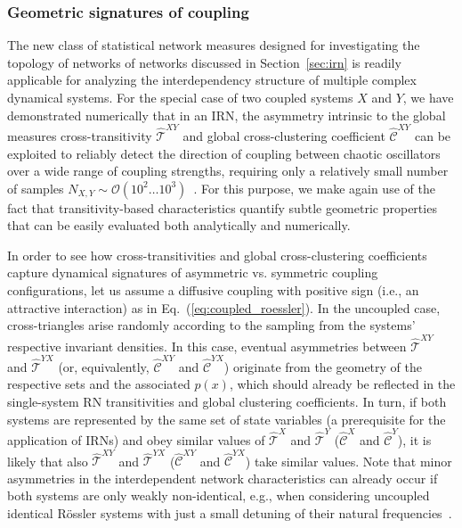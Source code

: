 \subsubsection{Geometric signatures of coupling}

The new class of statistical network measures designed for investigating the topology of networks of networks discussed in Section~\ref{sec:irn} is readily applicable for analyzing the interdependency structure of multiple complex dynamical systems. For the special case of two coupled systems $X$ and $Y$, we have demonstrated numerically that in an IRN, the asymmetry intrinsic to the global measures cross-transitivity $\hat{\mathcal{T}}^{XY}$ and global cross-clustering coefficient $\hat{\mathcal{C}}^{XY}$ can be exploited to reliably detect the direction of coupling between chaotic oscillators over a wide range of coupling strengths, requiring only a relatively small number of samples $N_{X,Y}\sim\mathcal{O}(10^2\dots 10^3)$~\cite{Feldhoff2012}. For this purpose, we make again use of the fact that transitivity-based characteristics quantify subtle geometric properties that can be easily evaluated both analytically and numerically. 

In order to see how cross-transitivities and global cross-clustering coefficients capture dynamical signatures of asymmetric vs. symmetric coupling configurations, let us assume a diffusive coupling with positive sign (i.e., an attractive interaction) as in Eq.~(\ref{eq:coupled_roessler}). In the uncoupled case, cross-triangles arise randomly according to the sampling from the systems' respective invariant densities. In this case, eventual asymmetries between $\hat{\mathcal{T}}^{XY}$ and $\hat{\mathcal{T}}^{YX}$ (or, equivalently, $\hat{\mathcal{C}}^{XY}$ and $\hat{\mathcal{C}}^{YX}$) originate from the geometry of the respective sets and the associated $p(x)$, which should already be reflected in the single-system RN transitivities and global clustering coefficients. In turn, if both systems are represented by the same set of state variables (a prerequisite for the application of IRNs) and obey similar values of $\hat{\mathcal{T}}^{X}$ and $\hat{\mathcal{T}}^{Y}$ ($\hat{\mathcal{C}}^{X}$ and $\hat{\mathcal{C}}^{Y}$), it is likely that also $\hat{\mathcal{T}}^{XY}$ and $\hat{\mathcal{T}}^{YX}$ ($\hat{\mathcal{C}}^{XY}$ and $\hat{\mathcal{C}}^{YX}$) take similar values. Note that minor asymmetries in the interdependent network characteristics can already occur if both systems are only weakly non-identical, e.g., when considering uncoupled identical R\"ossler systems with just a small detuning of their natural frequencies~\cite{Feldhoff2012}.


